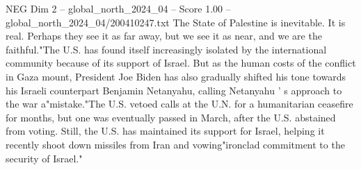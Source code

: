 \begin{textsample}{NEG Dim 2 – global\_north\_2024\_04 – Score 1.00 – global\_north\_2024\_04/200410247.txt}
The State of Palestine is inevitable.
It is real.
Perhaps they see it as far away, but we see it as near, and we are the faithful."The U.S. has found itself increasingly isolated by the international community because of its support of Israel.
But as the human costs of the conflict in Gaza mount, President Joe Biden has also gradually shifted his tone towards his Israeli counterpart Benjamin Netanyahu, calling Netanyahu ' s approach to the war a"mistake."The U.S. vetoed calls at the U.N. for a humanitarian ceasefire for months, but one was eventually passed in March, after the U.S. abstained from voting.
Still, the U.S. has maintained its support for Israel, helping it recently shoot down missiles from Iran and vowing"ironclad commitment to the security of Israel."

\end{textsample}
